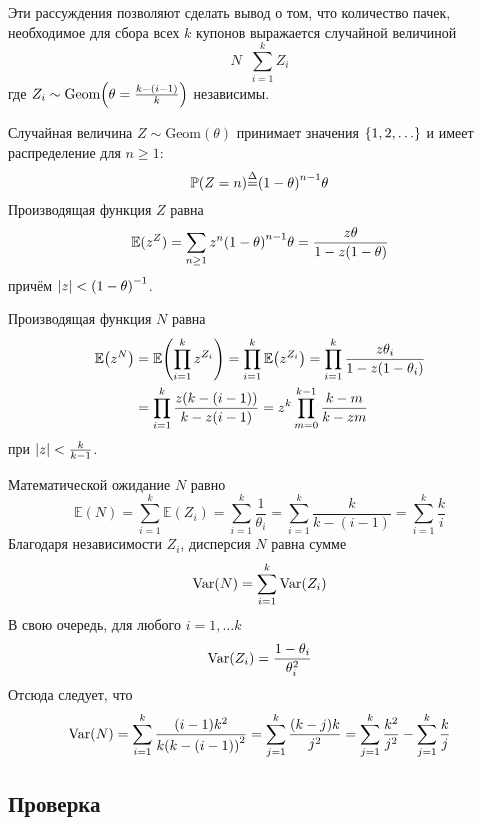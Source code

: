 \documentclass[a4paper]{article}
\let\originalleft\left
\let\originalright\right
\renewcommand{\left}{\mathopen{}\mathclose\bgroup\originalleft}
\renewcommand{\right}{\aftergroup\egroup\originalright}
\newcommand{\obj}[1]{{\left\{ #1 \right \}}}
\newcommand{\brac}[1]{{\left ( #1 \right )}}
\newcommand{\abs}[1]{{\left | #1 \right |}}
\newcommand{\Ex}[0]{{\mathbb{E}}}
\newcommand{\pr}[0]{{\mathbb{P}}}
\newcommand{\Var}[1]{{\text{Var}\brac{#1}}}
\newcommand{\defn}{{\mathop{\overset{\Delta}{=}}\nolimits}}
\begin{document}
Эти рассуждения позволяют сделать вывод о том, что количество пачек,
необходимое для сбора всех $k$ купонов выражается случайной величиной
\[N\defn \sum_{i=1}^k Z_i\]
где $Z_i\sim \text{Geom}\brac{\theta = \frac{k-(i-1)}{k}}$ независимы.

Случайная величина $Z\sim\text{Geom}(\theta)$ принимает значения
$\obj{1,2,\ldots}$ и имеет распределение для $n\geq 1$:
\[\pr(Z=n) \defn \brac{1-\theta}^{n-1} \theta\]
Производящая функция $Z$ равна
\[\Ex(z^Z) = \sum_{n\geq1} z^n \brac{1-\theta}^{n-1} \theta
= \frac{z\theta}{1-z(1-\theta)} \]
причём $\abs{z}<\brac{1-\theta}^{-1}$.

Производящая функция $N$ равна \begin{align*}
	\Ex\brac{z^N}
	&= \Ex\brac{\prod_{i=1}^k z^{Z_i}}
		= \prod_{i=1}^k \Ex\brac{z^{Z_i}}
		= \prod_{i=1}^k \frac{z\theta_i}{1-z(1-\theta_i)} \\
		& = \prod_{i=1}^k \frac{z \brac{k-(i-1)}}{k - z (i-1)}
		= z^k \prod_{m=0}^{k-1} \frac{k-m}{k - z m}
\end{align*}
при $\abs{z}<\frac{k}{k-1}$.

Математической ожидание $N$ равно
\[\Ex(N) = \sum_{i=1}^k \Ex(Z_i) = \sum_{i=1}^k \frac{1}{\theta_i}
= \sum_{i=1}^k \frac{k}{k-(i-1)} = \sum_{i=1}^k \frac{k}{i} \]
Благодаря независимости $Z_i$, дисперсия $N$ равна сумме
\[\Var{N} = \sum_{i=1}^k \Var{Z_i}\]
В свою очередь, для любого $i=1,\ldots k$
\[\Var{Z_i} = \frac{1-\theta_i}{\theta_i^2}\]
Отсюда следует, что
\[\Var{N} = \sum_{i=1}^k \frac{(i-1) k^2}{k \brac{k-(i-1)}^2}
	= \sum_{j=1}^k \frac{(k-j) k}{j^2}
	= \sum_{j=1}^k \frac{k^2}{j^2} - \sum_{j=1}^k \frac{k}{j}\]



\subsection*{Проверка} %
\label{sub:snaity_check}
\end{document}
